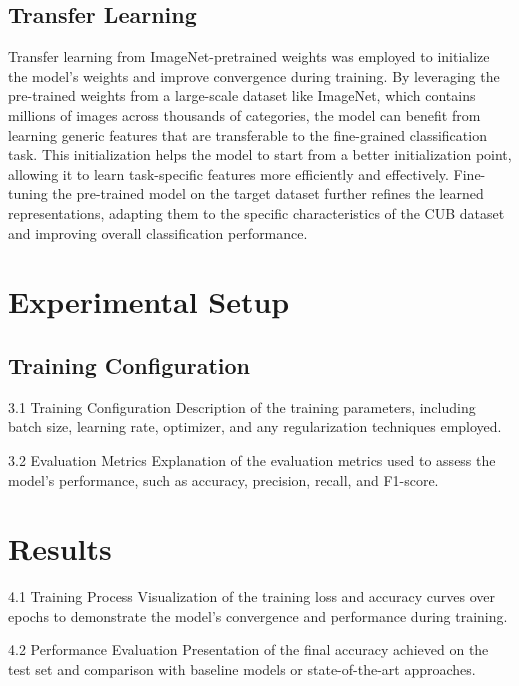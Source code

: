 \documentclass[12pt, a4paper, twoside]{article}
\begin{document}
		\subsection{Transfer Learning}
		
			Transfer learning from ImageNet-pretrained weights was employed to initialize the model's weights and improve convergence during training. By leveraging the pre-trained weights from a large-scale dataset like ImageNet, which contains millions of images across thousands of categories, the model can benefit from learning generic features that are transferable to the fine-grained classification task. This initialization helps the model to start from a better initialization point, allowing it to learn task-specific features more efficiently and effectively. Fine-tuning the pre-trained model on the target dataset further refines the learned representations, adapting them to the specific characteristics of the CUB dataset and improving overall classification performance.
		
		
		
	\section{Experimental Setup}
	
		\subsection{Training Configuration}
		
		3.1 Training Configuration
		Description of the training parameters, including batch size, learning rate, optimizer, and any regularization techniques employed.
		
		3.2 Evaluation Metrics
		Explanation of the evaluation metrics used to assess the model's performance, such as accuracy, precision, recall, and F1-score.
		
	\section{Results}
		
		4.1 Training Process
		Visualization of the training loss and accuracy curves over epochs to demonstrate the model's convergence and performance during training.
		
		4.2 Performance Evaluation
		Presentation of the final accuracy achieved on the test set and comparison with baseline models or state-of-the-art approaches.
		
\end{document}
